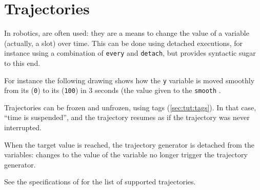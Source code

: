 \section{Trajectories}
\label{sec:lang:traj}

In robotics,  are often used: they are a
means to change the value of a variable (actually, a slot) over time.
This can be done using detached executions, for instance using a
combination of \lstinline|every| and \lstinline|detach|, but \us
provides syntactic sugar to this end.

For instance the following drawing shows how the \lstinline|y|
variable is moved smoothly from its 
(\lstinline|0|) to its  (\lstinline|100|) in 3
seconds (the value given to the \lstinline|smooth| .


Trajectories can be frozen and unfrozen, using tags
(\autoref{sec:tut:tags}).  In that case, ``time is suspended'', and
the trajectory resumes as if the trajectory was never interrupted.


When the target value is reached, the trajectory generator is detached
from the variables: changes to the value of the variable no longer
trigger the trajectory generator.


See the specifications of  for the list
of supported trajectories.


